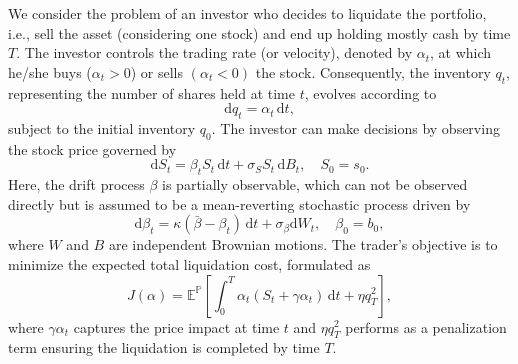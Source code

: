 \documentclass[11pt]{article}
\numberwithin{equation}{section}
\theoremstyle{plain}
\theoremstyle{definition}
\theoremstyle{remark}
\newcommand{\dd}{\mathrm{d}}
\begin{document}
	We consider the problem of an investor who decides to liquidate the portfolio, i.e., sell the asset (considering one stock) and end up holding mostly cash by time $T$. The investor controls the trading rate (or velocity), denoted by $\alpha_t$, at which he/she buys ($\alpha_t>0$) or sells $(\alpha_t<0)$ the stock. Consequently, the inventory $q_t$, representing the number of shares held at time $t$, evolves according to 
	\begin{equation*}
		\dd q_t = \alpha_t \,\dd t, 
	\end{equation*}
	subject to the initial inventory $q_0$. The investor can make decisions by observing the stock price governed by 
	\begin{equation*}
		\dd S_t = \beta_t S_t \,\dd t + \sigma_S S_t\,\dd B_t, \quad S_0 = s_0.
	\end{equation*}
	Here, the drift process $\beta$ is partially observable, which can not be observed directly but is assumed to be a mean-reverting stochastic process driven by 
	\begin{equation*}
		\dd \beta_t = \kappa (\bar{\beta} - \beta_t)\,\dd t + \sigma_\beta \dd W_t, \quad \beta_0 = b_0,  
	\end{equation*}
	where $W$ and $B$ are independent Brownian motions. The trader's objective is to minimize the expected total liquidation cost, formulated as 
	\begin{equation*}
		J(\alpha) = \mathbb{E}^{\mathbb{P}}\left[ \int_0^T \alpha_t(S_t + \gamma \alpha_t) \,\dd t + \eta q_T^2 \right], 
	\end{equation*}
	where $\gamma \alpha_t$ captures the price impact at time $t$ and $\eta q_T^2$ performs as a penalization term ensuring the liquidation is completed by time $T$. 
	
\end{document}
